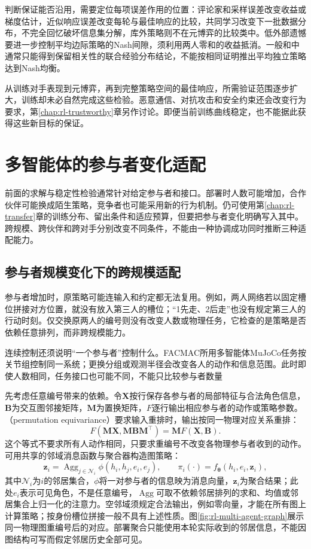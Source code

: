 判断保证能否沿用，需要定位每项误差作用的位置：评论家和采样误差改变收益或梯度估计，近似响应误差改变每轮与最佳响应的比较，共同学习改变下一批数据分布，不完全回忆破坏信息集分解，库外策略则不在元博弈的比较类中。低外部遗憾要进一步控制平均边际策略的Nash间隙，须利用两人零和的收益抵消。一般和中通常只能得到保留相关性的联合经验分布结论，不能按相同证明推出平均独立策略达到Nash均衡。

从训练对手表现到元博弈，再到完整策略空间的最佳响应，所需验证范围逐步扩大，训练却未必自然完成这些检验。恶意通信、对抗攻击和安全约束还会改变行为要求，第\ref{chap:rl-trustworthy}章另作讨论。即便当前训练曲线稳定，也不能据此获得这些新目标的保证。

\section{多智能体的参与者变化适配}
\label{sec:rl-multi-agent-adaptation}

前面的求解与稳定性检验通常针对给定参与者和接口。部署时人数可能增加，合作伙伴可能换成陌生策略，竞争者也可能采用新的行为机制。仍可使用第\ref{chap:rl-transfer}章的训练分布、留出条件和适应预算，但要把参与者变化明确写入其中。跨规模、跨伙伴和跨对手分别改变不同条件，不能由一种协调成功同时推断三种适配能力。

\subsection{参与者规模变化下的跨规模适配}
\label{sec:rl-multi-agent-scale}

参与者增加时，原策略可能连输入和约定都无法复用。例如，两人网络若以固定槽位拼接对方位置，就没有放入第三人的槽位；“1先走、2后走”也没有规定第三人的行动时刻。仅交换原两人的编号则没有改变人数或物理任务，它检查的是策略是否依赖任意排列，而非跨规模能力。

连续控制还须说明“一个参与者”控制什么。FACMAC所用多智能体MuJoCo任务按关节组控制同一系统；更换分组或观测半径会改变各人的动作和信息范围。此时即使人数相同，任务接口也可能不同，不能只比较参与者数量

先考虑任意编号带来的依赖。令$\bm X$按行保存各参与者的局部特征与合法角色信息，$\bm B$为交互图邻接矩阵，$\bm M$为置换矩阵，$F$逐行输出相应参与者的动作或策略参数。（permutation equivariance）要求输入重排时，输出按同一物理对应关系重排：
\[
 F(\bm M\bm X,\bm M\bm B\bm M^\top)=\bm M F(\bm X,\bm B).
\]
这个等式不要求所有人动作相同，只要求重编号不改变各物理参与者收到的动作。可用共享的邻域消息函数与聚合器构造图策略：
\[
 \bm z_i=\operatorname{Agg}_{j\in\mathcal N_i}
           \phi(h_i,h_j,e_i,e_j),\qquad
 \pi_i(\cdot)=f_{\bm\theta}(h_i,e_i,\bm z_i),
\]
其中$\mathcal N_i$为$i$的邻居集合，$\phi$将一对参与者的信息映为消息向量，$\bm z_i$为聚合结果；此处$e_i$表示可见角色，不是任意编号，$\operatorname{Agg}$可取不依赖邻居排列的求和、均值或邻居集合上归一化的注意力。空邻域须规定合法输出，例如零向量，才能在所有图上计算策略；按身份槽位拼接一般不具有上述性质。图\ref{fig:rl-multi-agent-graph}展示同一物理图重编号后的对应。部署聚合只能使用本轮实际收到的邻居信息，不能因图结构可写而假定邻居历史全部可见。

